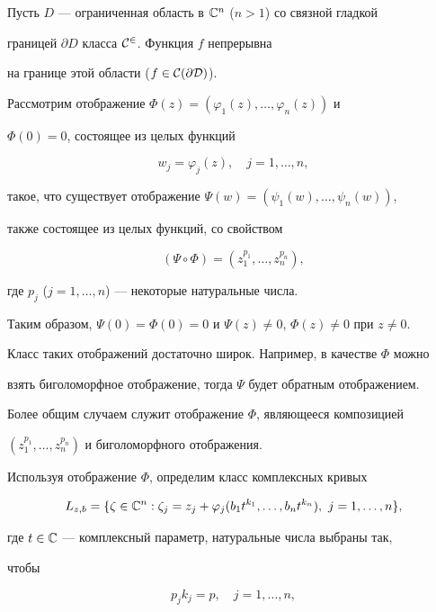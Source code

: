 \label{begin}





Пусть $D$ --- ограниченная область в $\Bbb C^n$ ($n>1$) со связной гладкой


границей $\partial D$ класса $\cal C^2$. Функция $f$ непрерывна


на границе этой области ($f\in\cal C(\partial D)$).





Рассмотрим отображение $\Phi(z)=(\varphi_1(z),\dotsc,\varphi_n(z))$ и


$\Phi(0)=0$, состоящее из целых функций


$$


w_j=\varphi_j(z),\quad j=1,\dotsc,n,


$$


такое, что существует отображение $\Psi(w)=(\psi_1(w),\dotsc,\psi_n(w))$,


также состоящее из целых функций, со свойством


$$


(\Psi\circ\Phi)=(z_1^{p_1},\dotsc,z_n^{p_n}),


$$


где $p_j$ ($j=1,\dotsc,n$) --- некоторые натуральные числа.


Таким образом, $\Psi(0)=\Phi(0)=0$ и $\Psi(z)\ne0$, $\Phi(z)\ne0$ при $z\ne0$.


Класс таких отображений достаточно широк. Например, в качестве $\Phi$ можно


взять биголоморфное отображение, тогда $\Psi$ будет обратным отображением.


Более общим случаем служит отображение $\Phi$, являющееся композицией


$(z_1^{p_1},\dotsc,z_n^{p_n})$ и биголоморфного отображения.





Используя отображение $\Phi$, определим класс комплексных кривых


$$


L_{z,b}=\{\zeta\in\Bbb C^n: \zeta_j=z_j+\varphi_j(b_1t^{k_1},\dotsc,


b_nt^{k_n}),\ j=1,\dotsc,n\},


$$


где $t\in\Bbb C$ --- комплексный параметр, натуральные числа выбраны так,


чтобы


\begin{equation}\label{1}


p_jk_j=p,\quad j=1,\dotsc,n,


\end{equation}


